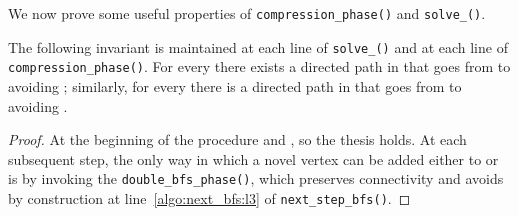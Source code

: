 We now prove some useful properties of \texttt{compression\_phase()} and \texttt{solve\_\mainproblem()}.

\begin{lemma}\label{lemma:reconstruct_path}
The following invariant is maintained at each line of \texttt{solve\_\mainproblem()}
and at each line of \texttt{compression\_phase()}.
For every  there exists a directed path in  that goes from  to  avoiding ;
similarly, for every  there is a directed path in  that goes from  to  avoiding .
\end{lemma}
\begin{proof}
At the beginning of the procedure  and , so the thesis holds.
At each subsequent step, the only way in which a novel vertex can be added either to  or 
is by invoking the \texttt{double\_bfs\_phase()},
which preserves connectivity and avoids  by construction at line~\ref{algo:next_bfs:l3} of \texttt{next\_step\_bfs()}.
\end{proof}

